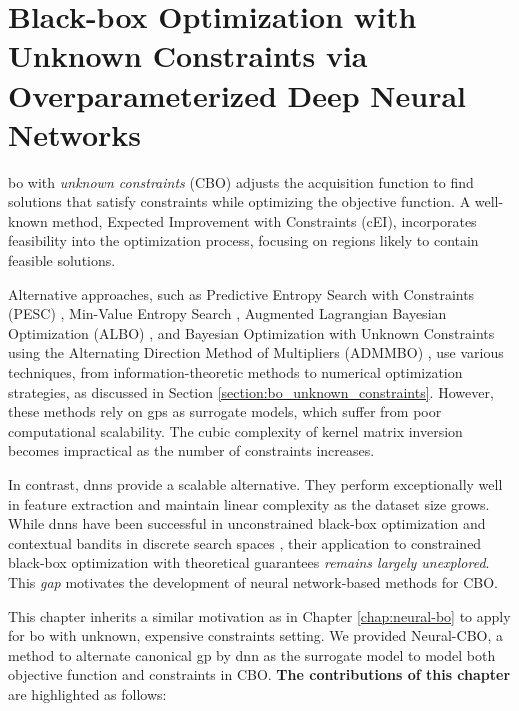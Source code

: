 \chapter{Black-box Optimization with Unknown Constraints via Overparameterized Deep Neural Networks} %
\label{chap:neural-cbo} %

\acl{bo} with \textit{unknown constraints} (CBO) adjusts the acquisition function to find solutions that satisfy constraints while optimizing the objective function. A well-known method, Expected Improvement with Constraints (cEI), incorporates feasibility into the optimization process, focusing on regions likely to contain feasible solutions.

Alternative approaches, such as Predictive Entropy Search with Constraints (PESC) \citep{hernandez2015predictive}, Min-Value Entropy Search \citep{takeno2022sequential}, Augmented Lagrangian Bayesian Optimization (ALBO) \citep{gramacy2016modeling}, and Bayesian Optimization with Unknown Constraints using the Alternating Direction Method of Multipliers (ADMMBO) \citep{ariafar2019admmbo}, use various techniques, from information-theoretic methods to numerical optimization strategies, as discussed in Section \ref{section:bo_unknown_constraints}. However, these methods rely on \acp{gp} as surrogate models, which suffer from poor computational scalability. The cubic complexity of kernel matrix inversion becomes impractical as the number of constraints increases.

In contrast, \acp{dnn} provide a scalable alternative. They perform exceptionally well in feature extraction and maintain linear complexity as the dataset size grows. While \acp{dnn} have been successful in unconstrained black-box optimization \citep{snoek2015scalable} and contextual bandits in discrete search spaces \citep{zhou2020neural,zhang2021neural}, their application to constrained black-box optimization with theoretical guarantees \emph{remains largely unexplored}. This \emph{gap} motivates the development of neural network-based methods for CBO.

This chapter inherits a similar motivation as in Chapter \ref{chap:neural-bo} to apply for \ac{bo} with unknown, expensive constraints setting. We provided Neural-CBO, a method to alternate canonical \ac{gp} by \ac{dnn} as the surrogate model to model both objective function and constraints in CBO. \textbf{The contributions of this chapter} are highlighted as follows:


